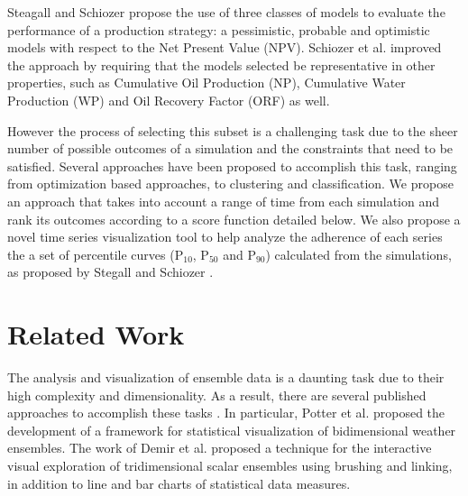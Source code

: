\documentclass{sigchi-ext}
\begin{document}
Steagall and Schiozer \cite{steagall:2001} propose the use of three classes of models to evaluate the performance of a production strategy: a pessimistic, probable and optimistic models with respect to the Net Present Value (NPV). Schiozer et al. \cite{schiozer:2004} improved the approach by requiring that the models selected be representative in other properties, such as Cumulative Oil Production (NP), Cumulative Water Production (WP) and Oil Recovery Factor (ORF) as well.

However the process of selecting this subset is a challenging task due to the sheer number of possible outcomes of a simulation and the constraints that need to be satisfied. Several approaches have been proposed to accomplish this task, ranging from optimization based approaches, to clustering and classification. We propose an approach that takes into account a range of time from each simulation and rank its outcomes according to a score function detailed below. We also propose a novel time series visualization tool to help analyze the adherence of each series the a set of percentile curves (P$_{10}$, P$_{50}$ and P$_{90}$) calculated from the simulations, as proposed by Stegall and Schiozer \cite{steagall:2001}.

\section{Related Work}
\label{sec:rel-work}
The analysis and visualization of ensemble data is a daunting task due to their high complexity and dimensionality. As a result, there are several published approaches to accomplish these tasks \cite{phadke:2012, hlawitschka:2013, ensemblevis-potter:2009, multicharts-demir:2014}. In particular, Potter et al. \cite{ensemblevis-potter:2009} proposed the development of a framework for statistical visualization of bidimensional weather ensembles. The work of Demir et al. \cite{multicharts-demir:2014} proposed a technique for the interactive visual exploration of tridimensional scalar ensembles using brushing and linking, in addition to line and bar charts of statistical data measures.
\end{document}
